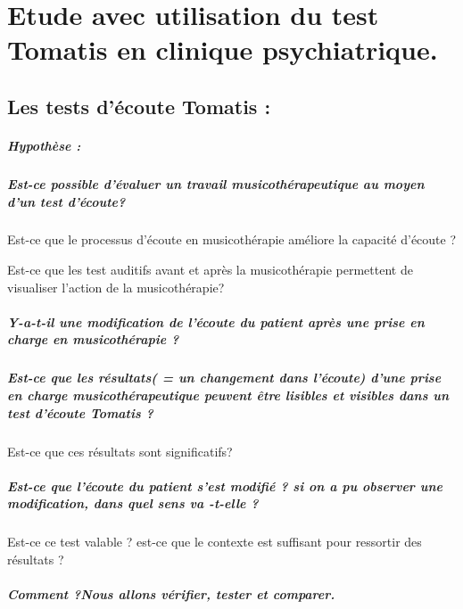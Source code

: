 \documentclass[12pt,french]{report}
\begin{document}
\chapter{Etude avec utilisation du test Tomatis en clinique psychiatrique.}

\section{Les tests d'écoute Tomatis : }

\paragraph{Hypothèse :}

\paragraph{Est-ce possible d'évaluer un travail musicothérapeutique au moyen
d'un test d'écoute?}

Est-ce que le processus d'écoute en musicothérapie améliore la capacité
d'écoute ?

Est-ce que les test auditifs avant et après la musicothérapie permettent
de visualiser l'action de la musicothérapie?

\paragraph{Y-a-t-il une modification de l'écoute du patient après une prise
en charge en musicothérapie ?}

\paragraph{Est-ce que les résultats( = un changement dans l'écoute) d'une prise
en charge musicothérapeutique peuvent être lisibles et visibles dans
un test d'écoute Tomatis ?}

Est-ce que ces résultats sont significatifs? 

\paragraph{Est-ce que l'écoute du patient s'est modifié ? si on a pu observer
une modification, dans quel sens va -t-elle ?}

Est-ce ce test valable ? est-ce que le contexte est suffisant pour
ressortir des résultats ?

\paragraph{Comment ?Nous allons vérifier, tester et comparer.}
\end{document}
